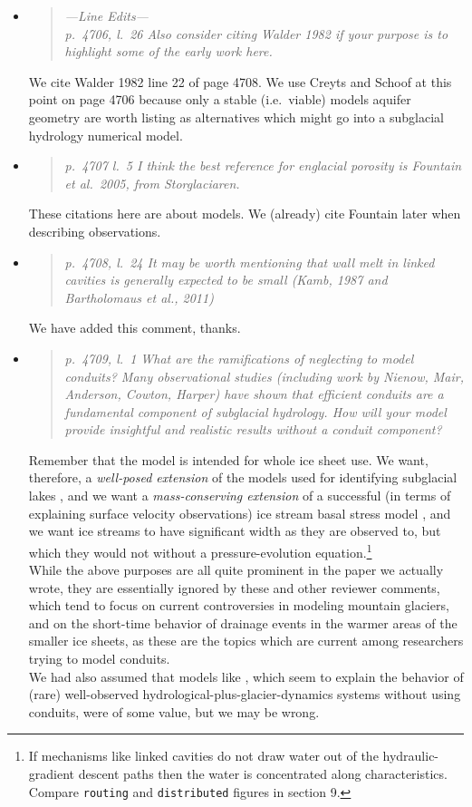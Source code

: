 \documentclass[11pt,reqno]{amsart}
\newcommand{\reply}[2]{
\medskip\medskip
\item  \begin{quote}
\emph{#1}
\end{quote}

\medskip
\noindent #2}
\begin{document}
\begin{itemize}
\reply{---Line Edits---\\
p.~4706, l.~26 Also consider citing Walder 1982 if your purpose is to highlight some of
the early work here.}
{We cite Walder 1982 line 22 of page 4708.  We use Creyts and Schoof at this point on page 4706 because only a stable (i.e.~viable) models aquifer geometry are worth listing as alternatives which might go into a subglacial hydrology numerical model.}

\reply{p.~4707 l.~5 I think the best reference for englacial porosity is Fountain et al.~2005, from Storglaciaren.}
{These citations here are about models.  We (already) cite Fountain later when describing observations.}

\reply{p.~4708, l.~24 It may be worth mentioning that wall melt in linked cavities is generally
expected to be small (Kamb, 1987 and Bartholomaus et al., 2011)}
{We have added this comment, thanks.}

\reply{p.~4709, l.~1 What are the ramifications of neglecting to model conduits? Many observational studies (including work by Nienow, Mair, Anderson, Cowton, Harper) have
shown that efficient conduits are a fundamental component of subglacial hydrology.
How will your model provide insightful and realistic results without a conduit component?}
{Remember that the model is intended for whole ice sheet use.  We want, therefore, a \emph{well-posed extension} of the models used for identifying subglacial lakes \cite{LeBrocqetal2009,Siegertetal2009}, and we want a \emph{mass-conserving extension} of a successful (in terms of explaining surface velocity observations) ice stream basal stress model \cite{AschwandenAdalgeirsdottirKhroulev,BBssasliding,Tulaczyketal2000}, and we want ice streams to have significant width as they are observed to, but which they would not without a pressure-evolution equation.\footnote{If mechanisms like linked cavities do not draw water out of the hydraulic-gradient descent paths then the water is concentrated along characteristics.  Compare \texttt{routing} and \texttt{distributed} figures in section 9.}\\
\indent While the above purposes are all quite prominent in the paper we actually wrote, they are essentially ignored by these and other reviewer comments, which tend to focus on current controversies in modeling mountain glaciers, and on the short-time behavior of drainage events in the warmer areas of the smaller ice sheets, as these are the topics which are current among researchers trying to model conduits. \\
\indent We had also assumed that models like \cite{Bartholomausetal2011}, which seem to explain the behavior of (rare) well-observed hydrological-plus-glacier-dynamics systems without using conduits, were of some value, but we may be wrong.}


\end{itemize}
\end{document}
